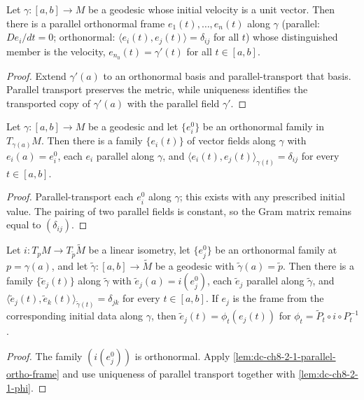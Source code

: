\begin{lemma}
  \label{lem:dc-ch8-2-1-velocity-frame}
  \leanok
  Let $\gamma:[a,b]\to M$ be a geodesic whose initial velocity is a unit vector. Then there is a parallel
  orthonormal frame $e_1(t),\dots,e_n(t)$ along $\gamma$ (parallel: $De_i/dt=0$; orthonormal:
  $\langle e_i(t),e_j(t)\rangle=\delta_{ij}$ for all $t$) whose distinguished member is the
  velocity, $e_{n_0}(t)=\gamma'(t)$ for all $t\in[a,b]$.
\end{lemma}
\begin{proof}
  \leanok
\sketch
  Extend $\gamma'(a)$ to an orthonormal basis and parallel-transport that basis.
  Parallel transport preserves the metric, while uniqueness identifies the transported
  copy of $\gamma'(a)$ with the parallel field $\gamma'$.
\end{proof}

\begin{lemma}
  \label{lem:dc-ch8-2-1-parallel-ortho-frame}
  \leanok
  Let $\gamma:[a,b]\to M$ be a geodesic and let $\{e^0_i\}$ be an orthonormal family in
  $T_{\gamma(a)}M$. Then there is a family $\{e_i(t)\}$ of vector fields along $\gamma$ with
  $e_i(a)=e^0_i$, each $e_i$ parallel along $\gamma$, and
  $\langle e_i(t),e_j(t)\rangle_{\gamma(t)}=\delta_{ij}$ for every $t\in[a,b]$.
\end{lemma}
\begin{proof}
  \leanok
\sketch
  Parallel-transport each $e^0_i$ along $\gamma$; this exists with any prescribed initial
  value. The pairing of two parallel fields is constant, so the Gram matrix remains
  equal to $(\delta_{ij})$.
\end{proof}

\begin{lemma}
  \label{lem:dc-ch8-2-1-transported-frame}
  \leanok
  Let $i:T_pM\to T_{\tilde p}\tilde M$ be a linear isometry, let $\{e^0_j\}$ be an orthonormal
  family at $p=\gamma(a)$, and let $\tilde\gamma:[a,b]\to\tilde M$ be a geodesic with
  $\tilde\gamma(a)=\tilde p$. Then there is a family $\{\tilde e_j(t)\}$ along $\tilde\gamma$
  with $\tilde e_j(a)=i(e^0_j)$, each $\tilde e_j$ parallel along $\tilde\gamma$, and
  $\langle\tilde e_j(t),\tilde e_k(t)\rangle_{\tilde\gamma(t)}=\delta_{jk}$ for every
  $t\in[a,b]$. If $e_j$ is the frame from the corresponding initial data along
  $\gamma$, then $\tilde e_j(t)=\phi_t(e_j(t))$ for
  $\phi_t=\tilde P_t\circ i\circ P_t^{-1}$.
\end{lemma}
\begin{proof}
  \leanok
\sketch
  The family $(i(e_j^0))$ is orthonormal. Apply
  \cref{lem:dc-ch8-2-1-parallel-ortho-frame} and use uniqueness of parallel
  transport together with \cref{lem:dc-ch8-2-1-phi}.
\end{proof}

